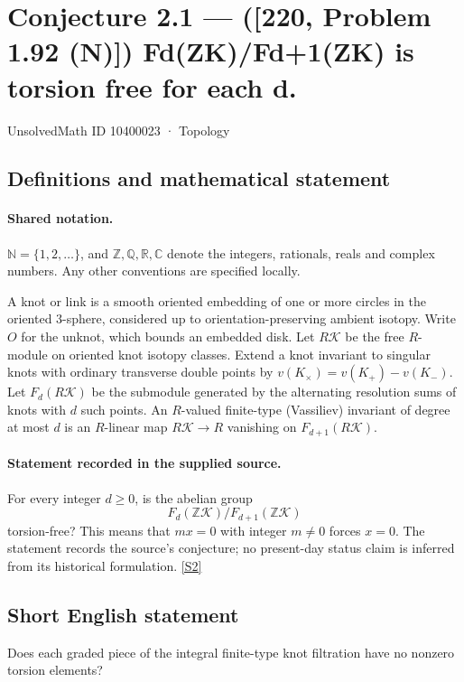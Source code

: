 \documentclass[11pt]{article}
\newcommand{\sref}[2]{\hyperlink{source:#1:#2}{[S#2]}}
\begin{document}
\setcounter{section}{10400022}
\section{Conjecture 2.1 — ([220, Problem 1.92 (N)]) Fd(ZK)/Fd+1(ZK) is torsion free for each d.}\label{10400023}
{\small\sffamily UnsolvedMath ID 10400023 · Topology}
\subsection{Definitions and mathematical statement}

\paragraph{Shared notation.}$\mathbb N=\{1,2,\ldots\}$, and $\mathbb Z,\mathbb Q,\mathbb R,\mathbb C$ denote the integers, rationals, reals and complex numbers. Any other conventions are specified locally.


A knot or link is a smooth oriented embedding of one or more circles in the oriented $3$-sphere, considered up to orientation-preserving ambient isotopy. Write $O$ for the unknot, which bounds an embedded disk. Let $R\mathcal K$ be the free $R$-module on oriented knot isotopy classes. Extend a knot invariant to singular knots with ordinary transverse double points by $v(K_\times)=v(K_+)-v(K_-)$. Let $F_d(R\mathcal K)$ be the submodule generated by the alternating resolution sums of knots with $d$ such points. An $R$-valued finite-type (Vassiliev) invariant of degree at most $d$ is an $R$-linear map $R\mathcal K\to R$ vanishing on $F_{d+1}(R\mathcal K)$.
\paragraph{Statement recorded in the supplied source.}
For every integer $d\ge0$, is the abelian group
\[F_d(\mathbb Z\mathcal K)/F_{d+1}(\mathbb Z\mathcal K)\]
torsion-free? This means that $m x=0$ with integer $m\ne0$ forces $x=0$. The statement records the source's conjecture; no present-day status claim is inferred from its historical formulation. \sref{10400023}{2}
\subsection{Short English statement}
Does each graded piece of the integral finite-type knot filtration have no nonzero torsion elements?
\end{document}
